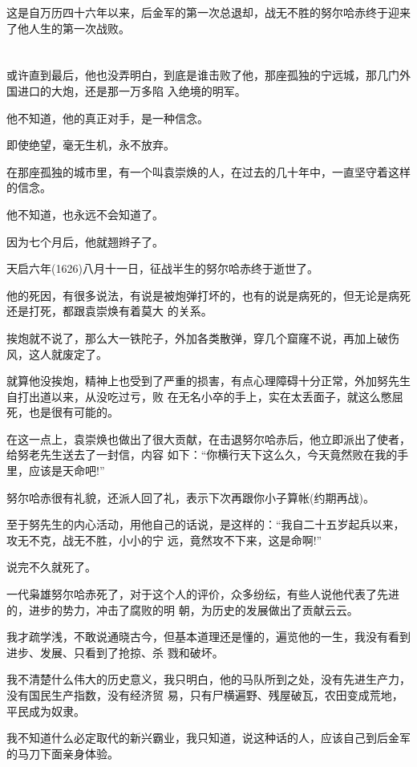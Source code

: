\documentclass[11pt,a4paper,onecolumn]{article}
\begin{document}
这是自万历四十六年以来，后金军的第一次总退却，战无不胜的努尔哈赤终于迎来了他人生的第一次战败。

\section[\thesection]{}

或许直到最后，他也没弄明白，到底是谁击败了他，那座孤独的宁远城，那几门外国进口的大炮，还是那一万多陷
入绝境的明军。

他不知道，他的真正对手，是一种信念。

即使绝望，毫无生机，永不放弃。

在那座孤独的城市里，有一个叫袁崇焕的人，在过去的几十年中，一直坚守着这样的信念。

他不知道，也永远不会知道了。

因为七个月后，他就翘辫子了。

天启六年(1626)八月十一日，征战半生的努尔哈赤终于逝世了。

他的死因，有很多说法，有说是被炮弹打坏的，也有的说是病死的，但无论是病死还是打死，都跟袁崇焕有着莫大
的关系。

挨炮就不说了，那么大一铁陀子，外加各类散弹，穿几个窟窿不说，再加上破伤风，这人就废定了。

就算他没挨炮，精神上也受到了严重的损害，有点心理障碍十分正常，外加努先生自打出道以来，从没吃过亏，败
在无名小卒的手上，实在太丢面子，就这么憋屈死，也是很有可能的。

在这一点上，袁崇焕也做出了很大贡献，在击退努尔哈赤后，他立即派出了使者，给努老先生送去了一封信，内容
如下：``你横行天下这么久，今天竟然败在我的手里，应该是天命吧!''

努尔哈赤很有礼貌，还派人回了礼，表示下次再跟你小子算帐(约期再战)。

至于努先生的内心活动，用他自己的话说，是这样的：``我自二十五岁起兵以来，攻无不克，战无不胜，小小的宁
远，竟然攻不下来，这是命啊!''

说完不久就死了。

一代枭雄努尔哈赤死了，对于这个人的评价，众多纷纭，有些人说他代表了先进的，进步的势力，冲击了腐败的明
朝，为历史的发展做出了贡献云云。

我才疏学浅，不敢说通晓古今，但基本道理还是懂的，遍览他的一生，我没有看到进步、发展、只看到了抢掠、杀
戮和破坏。

我不清楚什么伟大的历史意义，我只明白，他的马队所到之处，没有先进生产力，没有国民生产指数，没有经济贸
易，只有尸横遍野、残屋破瓦，农田变成荒地，平民成为奴隶。

我不知道什么必定取代的新兴霸业，我只知道，说这种话的人，应该自己到后金军的马刀下面亲身体验。
\end{document}
